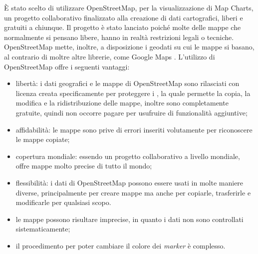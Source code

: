È stato scelto di utilizzare OpenStreetMap, per la visualizzazione di Map Charts, un progetto collaborativo finalizzato alla creazione di dati cartografici, liberi e gratuiti a chiunque. Il progetto è stato lanciato poiché molte delle mappe che normalmente si pensano libere, hanno in realtà restrizioni legali o tecniche. OpenStreetMap mette, inoltre, a disposizione i geodati su cui le mappe si basano, al contrario di moltre altre librerie, come Google Maps .
L'utilizzo di OpenStreetMap offre i seguenti vantaggi:
\begin{itemize}
\item libertà: i dati geografici e le mappe di OpenStreetMap sono rilasciati con licenza creata specificamente per proteggere i , la quale permette la copia, la modifica e la ridistribuzione delle mappe, inoltre sono completamente gratuite, quindi non occorre pagare per usufruire di funzionalità aggiuntive;
\item affidabilità: le mappe sono prive di errori inseriti volutamente per riconoscere le mappe copiate;
\item copertura mondiale: essendo un progetto collaborativo a livello mondiale, offre mappe molto precise di tutto il mondo;
\item flessibilità: i dati di OpenStreetMap possono essere usati in molte maniere diverse, principalmente per creare mappe ma anche per copiarle, trasferirle e modificarle per qualsiasi scopo.
\end{itemize}
\begin{itemize}
\item le mappe possono risultare imprecise, in quanto i dati non sono controllati sistematicamente;
\item il procedimento per poter cambiare il colore dei \textit{marker} è complesso.
\end{itemize}

